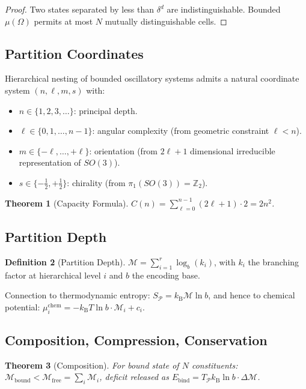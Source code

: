 \documentclass[twocolumn,10pt,a4paper]{article}
\newtheorem{theorem}{Theorem}[section]
\theoremstyle{definition}
\newtheorem{definition}[theorem]{Definition}
\theoremstyle{remark}
\newcommand{\kB}{k_{\mathrm{B}}}
\newcommand{\Depth}{\mathcal{M}}
\newcommand{\Partition}{\mathcal{P}}
\begin{document}
\begin{proof}
Two states separated by less than $\delta^d$ are indistinguishable. Bounded $\mu(\Omega)$ permits at most $N$ mutually distinguishable cells.
\end{proof}

\subsection{Partition Coordinates}

Hierarchical nesting of bounded oscillatory systems admits a natural coordinate system $(n,\ell,m,s)$ with:
\begin{itemize}[leftmargin=*,nosep]
    \item $n\in\{1,2,3,\ldots\}$: principal depth.
    \item $\ell\in\{0,1,\ldots,n-1\}$: angular complexity (from geometric constraint $\ell < n$).
    \item $m\in\{-\ell,\ldots,+\ell\}$: orientation (from $2\ell+1$ dimensional irreducible representation of $SO(3)$).
    \item $s\in\{-\tfrac{1}{2},+\tfrac{1}{2}\}$: chirality (from $\pi_1(SO(3)) = \mathbb{Z}_2$).
\end{itemize}

\begin{theorem}[Capacity Formula]
$C(n) = \sum_{\ell=0}^{n-1}(2\ell+1)\cdot 2 = 2n^2$.
\end{theorem}

\subsection{Partition Depth}

\begin{definition}[Partition Depth]
$\Depth = \sum_{i=1}^{r}\log_b(k_i)$, with $k_i$ the branching factor at hierarchical level $i$ and $b$ the encoding base.
\end{definition}

Connection to thermodynamic entropy: $S_\Partition = \kB\Depth\ln b$, and hence to chemical potential: $\mu_i^{\mathrm{chem}} = -\kB T\ln b\cdot\Depth_i + c_i$.

\subsection{Composition, Compression, Conservation}

\begin{theorem}[Composition]
\label{thm:composition}
For bound state of $N$ constituents: $\Depth_{\mathrm{bound}} < \Depth_{\mathrm{free}} = \sum_i\Depth_i$, deficit released as $E_{\mathrm{bind}} = T_\Partition\kB\ln b\cdot\Delta\Depth$.
\end{theorem}
\end{document}
